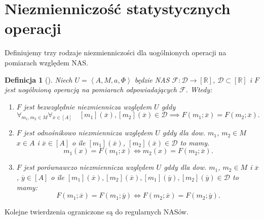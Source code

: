 \documentclass[12pt,a4paper]{report}
\newtheorem{definition}{Definicja}[chapter]
\newcommand{\domkniecie}[1]{\left[ {#1} \right] }
\newcommand{\tuple}[1]{\left\langle {#1} \right\rangle}
\begin{document}
\section{Niezmienniczość statystycznych operacji}
Definiujemy trzy rodzaje niezmienniczości dla uogólnionych operacji na pomiarach względem NAS. 
\begin{definition}[{\citep[Def. 5]{adams1965theory}}]
Niech $U=\tuple{A,M,a,\Phi}$ będzie NAS $\mathcal{F}:\mathcal{D}\to\domkniecie{\mathbb{R}}$, $\mathcal{D}\subset \domkniecie{\mathbb{R}}$ i $F$ jest uogólnioną operacją na pomiarach odpowiadających $\mathcal{F}$. Wtedy:
\begin{enumerate}
\item
$F$ jest bezwzględnie niezmiennicza względem $U$ gddy
$$
\forall_{m_{1}, m_{2} \in M}  \forall_{\overline{x} \in \domkniecie{A}} \quad \domkniecie{m_1}(\overline{x}), \domkniecie{m_2}(\overline{x})\in \mathcal{D} \implies F(m_{1};\overline{x})=F(m_{2};\overline{x}).
$$
\item
$F$ jest odnośnikowo niezmiennicza względem $U$ gddy dla dow. $m_{1}$, $m_{2} \in M$ $x \in A$ i  $\overline{x} \in \domkniecie{A}$ o ile  $\domkniecie{m_1}(\overline{x})$, $\domkniecie{m_2}(\overline{x})\in \mathcal{D}$ to mamy.
$$
 m_{1}(x)=F(m_{1};\overline{x}) \iff m_{2}(x)=F(m_{2};\overline{x}).
$$
\item
$F$ jest porównawczo niezmiennicza względem $U$ gddy dla dow. $m_1$, $m_2 \in M$ i $\overline{x}$, $\overline{y} \in \domkniecie{A}$ o ile $\domkniecie{m_1}(\overline{x}), \domkniecie{ m_2}(\overline{x}), \domkniecie{m_1}(\overline{y}), \domkniecie{m_2}(\overline{y}) \in \mathcal{D}$ to mamy:
$$
F(m_{1};\overline{x})=F(m_{1};\overline{y}) \iff F(m_{2};\overline{x})=F(m_{2};\overline{y}).
$$
\end{enumerate} 
\end{definition}

Kolejne twierdzenia ograniczone są do regularnych NASów.
\end{document}
